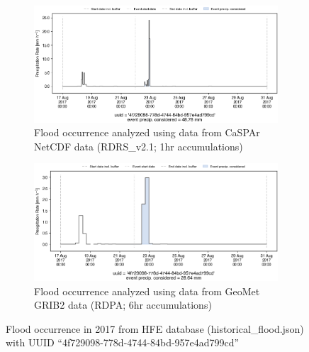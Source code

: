 \documentclass[10pt,a4paper,titlepage,parskip]{scrartcl}
\begin{document}
\begin{figure}[h]
	\begin{subfigure}[a]{1.0\textwidth}
		\centering
		\includegraphics[width=\linewidth]{figures/compare_Geomet_CaSPAr/interpolated_at_stations_occurrence_963_identified-timesteps_RDRS_v2.1.png}
		\caption{Flood occurrence analyzed using data from CaSPAr NetCDF data (RDRS\_v2.1; 1hr accumulations)}
	\end{subfigure}
	\par\bigskip\bigskip
	\begin{subfigure}[b]{1.0\textwidth}
		\centering
		\includegraphics[width=\linewidth]{figures/compare_Geomet_CaSPAr/interpolated_at_stations_occurrence_963_identified-timesteps_rdpa_10km_6f.png}
		\caption{Flood occurrence analyzed using data from GeoMet GRIB2 data (RDPA; 6hr accumulations)}
	\end{subfigure}
	\par\bigskip\bigskip
	\caption{Flood occurrence in 2017 from HFE database (historical\_flood.json) with UUID ``4f729098-778d-4744-84bd-957e4ad799cd''}
\end{figure}
\pagebreak
\end{document}
